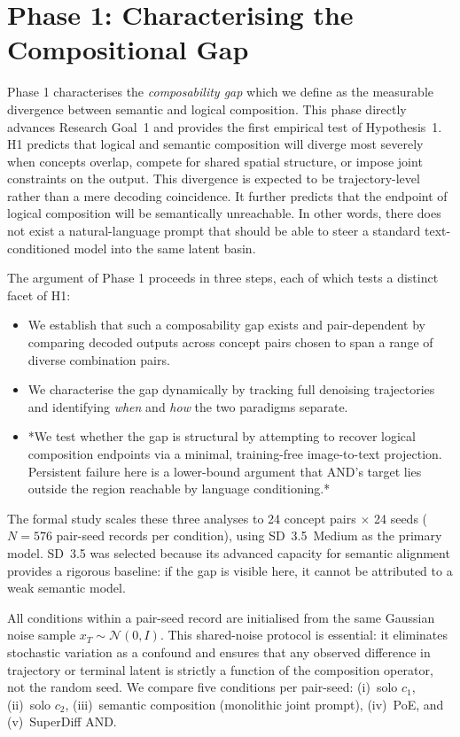 \section{Phase 1: Characterising the Compositional Gap}
\label{sec:phase_1}

Phase 1 characterises the \emph{composability gap} which we define as the measurable divergence between semantic and logical composition.
This phase directly advances Research Goal~1 and provides the first empirical test of Hypothesis~1.
H1 predicts that logical and semantic composition will diverge most severely when concepts overlap, compete for shared spatial structure, or impose joint constraints on the output.
This divergence is expected to be trajectory-level rather than a mere decoding coincidence.
It further predicts that the endpoint of logical composition will be semantically unreachable. In other words, there does not exist a natural-language prompt that should be able to steer a standard text-conditioned model into the same latent basin.

The argument of Phase 1 proceeds in three steps, each of which tests a distinct facet of H1:

\begin{itemize}
    \item We establish that such a composability gap exists and pair-dependent by comparing decoded outputs across concept pairs chosen to span a range of diverse combination pairs.
    \item We characterise the gap dynamically by tracking full denoising trajectories and identifying \emph{when} and \emph{how} the two paradigms separate.
    \item *We test whether the gap is structural by attempting to recover logical composition endpoints via a minimal, training-free image-to-text projection. Persistent failure here is a lower-bound argument that AND's target lies outside the region reachable by language conditioning.*
\end{itemize}

The formal study scales these three analyses to 24 concept pairs $\times$ 24 seeds ($N = 576$ pair-seed records per condition), using SD~3.5~Medium as the primary model.
SD~3.5 was selected because its advanced capacity for semantic alignment provides a rigorous baseline: if the gap is visible here, it cannot be attributed to a weak semantic model.

All conditions within a pair-seed record are initialised from the same Gaussian noise sample $x_T \sim \mathcal{N}(0, I)$.
This shared-noise protocol is essential: it eliminates stochastic variation as a confound and ensures that any observed difference in trajectory or terminal latent is strictly a function of the composition operator, not the random seed.
We compare five conditions per pair-seed: (i)~solo $c_1$, (ii)~solo $c_2$, (iii)~semantic composition (monolithic joint prompt), (iv)~PoE, and (v)~SuperDiff AND.


